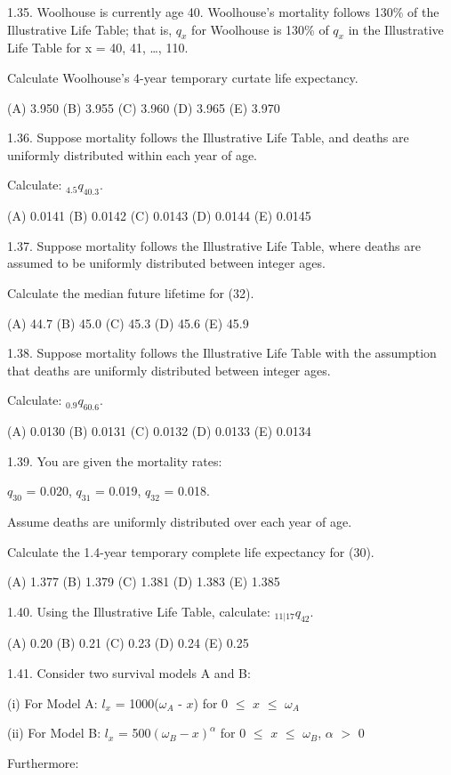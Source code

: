 \documentclass[]{book}
\begin{document}
1.35. Woolhouse is currently age 40. Woolhouse's mortality follows 130\%
of the Illustrative Life Table; that is, \(q_x\) for Woolhouse is 130\%
of \(q_x\) in the Illustrative Life Table for x = 40, 41, \ldots{}, 110.

Calculate Woolhouse's 4-year temporary curtate life expectancy.

(A) 3.950 (B) 3.955 (C) 3.960 (D) 3.965 (E) 3.970

1.36. Suppose mortality follows the Illustrative Life Table, and deaths
are uniformly distributed within each year of age.

Calculate: \({}_{4.5}q_{40.3}\).

(A) 0.0141 (B) 0.0142 (C) 0.0143 (D) 0.0144 (E) 0.0145

1.37. Suppose mortality follows the Illustrative Life Table, where
deaths are assumed to be uniformly distributed between integer ages.

Calculate the median future lifetime for (32).

(A) 44.7 (B) 45.0 (C) 45.3 (D) 45.6 (E) 45.9

1.38. Suppose mortality follows the Illustrative Life Table with the
assumption that deaths are uniformly distributed between integer ages.

Calculate: \({}_{0.9}q_{60.6}\).

(A) 0.0130 (B) 0.0131 (C) 0.0132 (D) 0.0133 (E) 0.0134

1.39. You are given the mortality rates:

\(q_{30}\) = 0.020, \(q_{31}\) = 0.019, \(q_{32}\) = 0.018.

Assume deaths are uniformly distributed over each year of age.

Calculate the 1.4-year temporary complete life expectancy for (30).

(A) 1.377 (B) 1.379 (C) 1.381 (D) 1.383 (E) 1.385

1.40. Using the Illustrative Life Table, calculate:
\({}_{11|17}q_{42}\).

(A) 0.20 (B) 0.21 (C) 0.23 (D) 0.24 (E) 0.25

1.41. Consider two survival models A and B:

(i) For Model A: \(l_x\) = 1000(\(\omega_A\) - \(x\)) for 0 \(\le\)
\(x\) \(\le\) \(\omega_A\)

(ii) For Model B: \(l_x\) = 500\((\omega_B - x)^{\alpha}\) for 0 \(\le\)
\(x\) \(\le\) \(\omega_B\), \(\alpha\) \(>\) 0

Furthermore:
\end{document}
